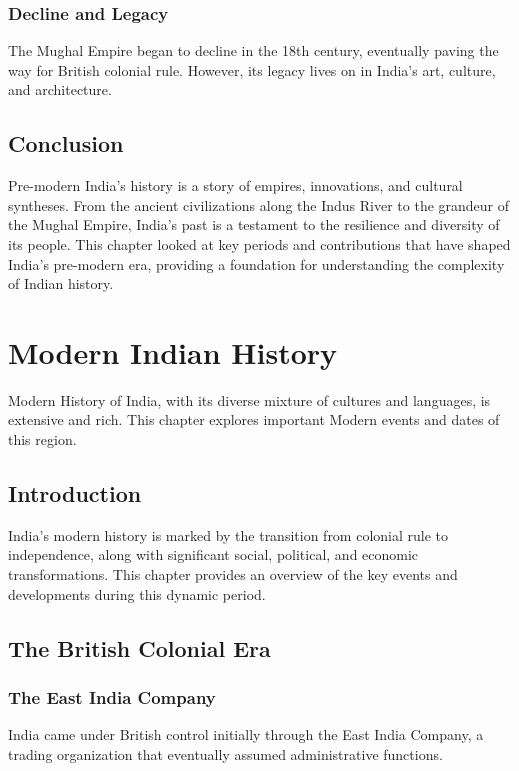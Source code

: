\documentclass[a4paper,12pt]{book}
\begin{document}
\subsection{Decline and Legacy}
The Mughal Empire began to decline in the 18th century, eventually paving the way for British colonial rule. However, its legacy lives on in India’s art, culture, and architecture.

\section{Conclusion}
\label{sec:conclusion-pre-modern-india}
Pre-modern India’s history is a story of empires, innovations, and cultural syntheses. From the ancient civilizations along the Indus River to the grandeur of the Mughal Empire, India’s past is a testament to the resilience and diversity of its people. This chapter looked at key periods and contributions that have shaped India’s pre-modern era, providing a foundation for understanding the complexity of Indian history.

\chapter{Modern Indian History}
\label{ch:modern-indian-history}

Modern History of India, with its diverse mixture of cultures and languages, is extensive and rich. This chapter explores important Modern events and dates of this region.

\section{Introduction}
\label{sec:introduction-modern-india}
India’s modern history is marked by the transition from colonial rule to independence, along with significant social, political, and economic transformations. This chapter provides an overview of the key events and developments during this dynamic period.

\section{The British Colonial Era}
\label{sec:british-colonial-era}

\subsection{The East India Company}
India came under British control initially through the East India Company, a trading organization that eventually assumed administrative functions.
\end{document}
